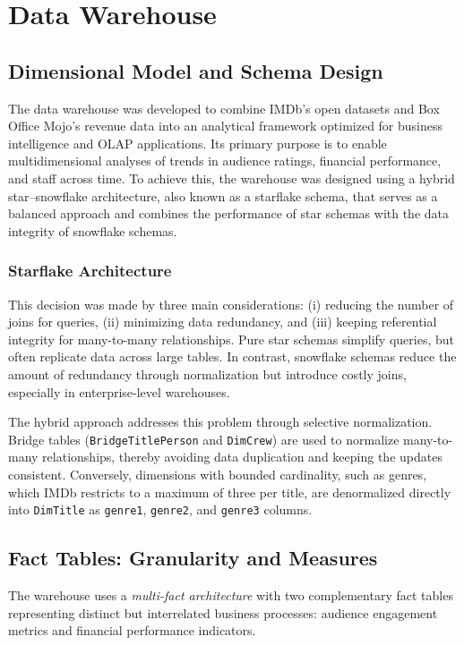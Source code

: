 \section{Data Warehouse}

\subsection{Dimensional Model and Schema Design}

The data warehouse was developed to combine IMDb’s open datasets and Box Office Mojo’s revenue data into an analytical framework optimized for business intelligence and OLAP applications. Its primary purpose is to enable multidimensional analyses of trends in audience ratings, financial performance, and staff across time. To achieve this, the warehouse was designed using a hybrid star–snowflake architecture, also known as a starflake schema, that serves as a balanced approach and combines the performance of star schemas with the data integrity of snowflake schemas.

\subsubsection{Starflake Architecture}

This decision was made by three main considerations: (i) reducing the number of joins for queries, (ii) minimizing data redundancy, and (iii) keeping referential integrity for many-to-many relationships. Pure star schemas simplify queries, but often replicate data across large tables. In contrast, snowflake schemas reduce the amount of redundancy through normalization but introduce costly joins, especially in enterprise-level warehouses.

The hybrid approach addresses this problem through selective normalization. Bridge tables (\texttt{BridgeTitlePerson} and \texttt{DimCrew}) are used to normalize many-to-many relationships, thereby avoiding data duplication and keeping the updates consistent. Conversely, dimensions with bounded cardinality, such as genres, which IMDb restricts to a maximum of three per title, are denormalized directly into \texttt{DimTitle} as \texttt{genre1}, \texttt{genre2}, and \texttt{genre3} columns.

\subsection{Fact Tables: Granularity and Measures}

The warehouse uses a \textit{multi-fact architecture} with two complementary fact tables representing distinct but interrelated business processes: audience engagement metrics and financial performance indicators.

